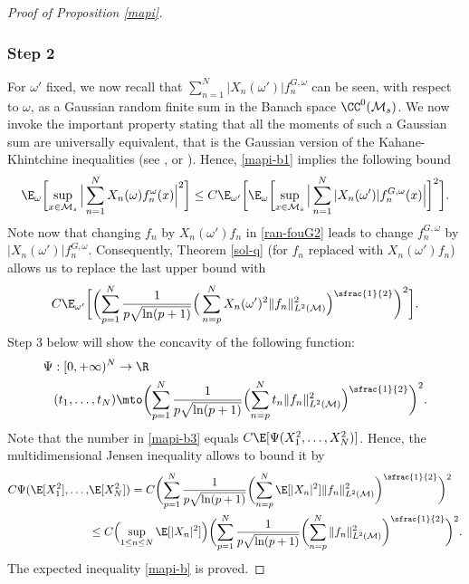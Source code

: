 \begin{proof}[Proof of Proposition \ref{mapi}]
\subsubsection*{Step 2}
For $\omega'$ fixed, we now recall that $\sum_{n=1}^N |X_n(\omega')| f_n^{G,\omega}$ can be seen, with respect to $\omega$, as a Gaussian random finite sum in the Banach space $\CC^0(\mathcal{M}_s)$.
We now invoke the important property stating that all the moments of such a Gaussian sum are universally equivalent, that is the Gaussian version of the Kahane-Khintchine inequalities (see \cite[Cor.\,3.2]{ledoux}, \cite[p.\,44]{pisier1981} or \cite[p.\,256, Cor.\,V.27]{queff1}).
Hence, \eqref{mapi-b1} implies the following bound
\begin{equation*}
\E_{\omega}\biggl[\sup_{x\in \mathcal{M}_s}\Big|\sum_{n=1}^N X_n(\omega)f_n^{\omega}(x)\Big|^{2} \biggr]\leq C\E_{\omega'}\biggl[\E_{\omega}\biggl[\sup_{x\in \mathcal{M}_s}\Big| \sum_{n=1}^N |X_n(\omega')| f_n^{G,\omega}(x) \Big| \biggr]^2 \biggr].
\end{equation*}
Note now that changing $f_n$ by $X_n(\omega')f_n$ in \eqref{ran-fouG2} leads to change $f_n^{G,\omega}$ by $|X_n(\omega')| f_n^{G,\omega}$.
Consequently, Theorem \ref{sol-q} (for $f_n$ replaced with $X_n(\omega')f_n$) allows us to replace the last upper bound with
\begin{equation}\label{mapi-b3}
C\E_{\omega'}\biggl[\biggl(\sum_{p=1}^N \frac{1}{p\sqrt{\ln(p+1)}}\Big(\sum_{n=p}^{N} X_n(\omega')^2\|f_n\|_{L^2(\mathcal{M})}^2 \Big)^{\sfrac{1}{2}}\biggr)^2\biggr].
\end{equation}
Step 3 below will show the concavity of the following function:
\begin{equation}\label{concav}
\begin{split}
\Psi: [0,+\infty)^N & \to\R \\
(t_1,\dots,t_N) & \mto \biggl(\sum_{p=1}^N \frac{1}{p\sqrt{\ln(p+1)}}\Bigl(\sum_{n=p}^{N} t_n \|f_n\|_{L^2(\mathcal{M})}^2 \Bigr)^{\sfrac{1}{2}}\biggr)^2.
\end{split}
\end{equation}
Note that the number in \eqref{mapi-b3} equals $C \E[\Psi(X_1^2,\dots,X_N^2)]$.
Hence, the multidimensional Jensen inequality allows to bound it by
\begin{align*}
C \Psi(\E[X_1^2],\dots,&\E[X_N^2])
=C\biggl(\sum_{p=1}^N \frac{1}{p\sqrt{\ln(p+1)}}\biggl(\sum_{n=p}^{N} \E[| X_n|^2]\|f_n\|_{L^2(\mathcal{M})}^2 \biggr)^{\sfrac{1}{2}}\biggr)^2\\
&\leq C \Bigl(\sup_{1\leq n\leq N} \E[|X_n|^2] \Bigr)
\biggl(\sum_{p=1}^N \frac{1}{p\sqrt{\ln(p+1)}}\biggl(\sum_{n=p}^{N} \|f_n\|_{L^2(\mathcal{M})}^2 \biggr)^{\sfrac{1}{2}}\biggr)^2.
\end{align*}
The expected inequality \eqref{mapi-b} is proved.


\end{proof}
